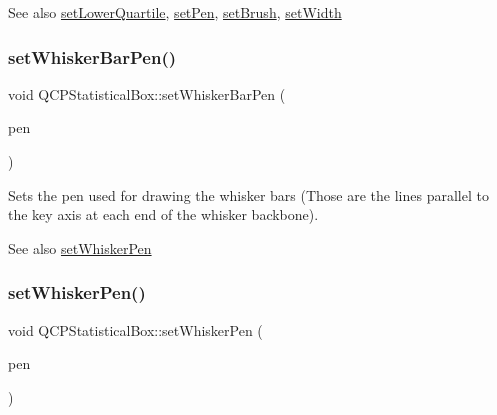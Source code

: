 \begin{DoxySeeAlso}{See also}
\hyperlink{class_q_c_p_statistical_box_a680941af5e23d902013962fa67223f9e}{set\+Lower\+Quartile}, \hyperlink{class_q_c_p_abstract_plottable_ab74b09ae4c0e7e13142fe4b5bf46cac7}{set\+Pen}, \hyperlink{class_q_c_p_abstract_plottable_a7a4b92144dca6453a1f0f210e27edc74}{set\+Brush}, \hyperlink{class_q_c_p_statistical_box_a0b62775bd67301b1eba5c785f2b26f14}{set\+Width} 
\end{DoxySeeAlso}
\hypertarget{class_q_c_p_statistical_box_aa8d3e503897788e1abf68dc74b5f147f}{}\label{class_q_c_p_statistical_box_aa8d3e503897788e1abf68dc74b5f147f} 
\subsubsection{\texorpdfstring{set\+Whisker\+Bar\+Pen()}{setWhiskerBarPen()}}
{\footnotesize\ttfamily void Q\+C\+P\+Statistical\+Box\+::set\+Whisker\+Bar\+Pen (\begin{DoxyParamCaption}\item[{const Q\+Pen \&}]{pen }\end{DoxyParamCaption})}

Sets the pen used for drawing the whisker bars (Those are the lines parallel to the key axis at each end of the whisker backbone).

\begin{DoxySeeAlso}{See also}
\hyperlink{class_q_c_p_statistical_box_a4a5034cb3b9b040444df05ab1684620b}{set\+Whisker\+Pen} 
\end{DoxySeeAlso}
\hypertarget{class_q_c_p_statistical_box_a4a5034cb3b9b040444df05ab1684620b}{}\label{class_q_c_p_statistical_box_a4a5034cb3b9b040444df05ab1684620b} 
\subsubsection{\texorpdfstring{set\+Whisker\+Pen()}{setWhiskerPen()}}
{\footnotesize\ttfamily void Q\+C\+P\+Statistical\+Box\+::set\+Whisker\+Pen (\begin{DoxyParamCaption}\item[{const Q\+Pen \&}]{pen }\end{DoxyParamCaption})}

